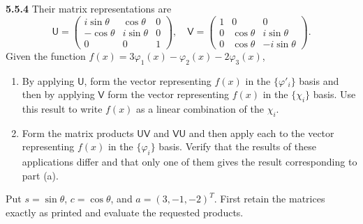 \par\bigskip
\noindent\textbf{5.5.4}\quad {} Their matrix representations are
\[
\mathsf{U}=\begin{pmatrix}i\sin\theta&\cos\theta&0\\
-\cos\theta&i\sin\theta&0\\0&0&1\end{pmatrix},\quad
\mathsf{V}=\begin{pmatrix}1&0&0\\0&\cos\theta&i\sin\theta\\
0&\cos\theta&-i\sin\theta\end{pmatrix}.
\]
Given the function $f(x)=3\varphi_{1}(x)-\varphi_{2}(x)-2\varphi_{3}(x)$,
\begin{enumerate}
\item[(a)] By applying $\mathsf{U}$, form the vector representing $f(x)$ in
  the $\{\varphi'_{i}\}$ basis and then by applying $\mathsf{V}$ form the
  vector representing $f(x)$ in the $\{\chi_{i}\}$ basis. Use this result to
  write $f(x)$ as a linear combination of the $\chi_{i}$.
\item[(b)] Form the matrix products $\mathsf{UV}$ and $\mathsf{VU}$ and then
  apply each to the vector representing $f(x)$ in the $\{\varphi_{i}\}$ basis.
  Verify that the results of these applications differ and that only one of
  them gives the result corresponding to part (a).
\end{enumerate}
\solution
Put $s=\sin\theta$, $c=\cos\theta$, and $a=(3,-1,-2)^T$.
First retain the matrices exactly as printed and evaluate the requested
products.

